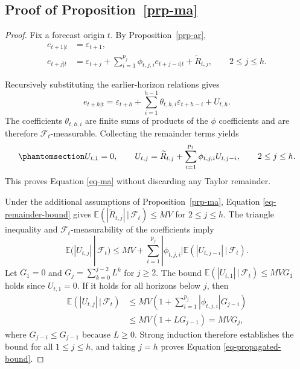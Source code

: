 \documentclass[
  american,
  12pt]{article}
\theoremstyle{plain}
\theoremstyle{plain}
\theoremstyle{remark}
\begin{document}
\subsection{\texorpdfstring{Proof of
Proposition~\ref{prp-ma}}{Proof of Proposition~}}\label{sec-proof_ma}

\begin{proof}
Fix a forecast origin \(t\). By Proposition~\ref{prp-ar}, \begin{align*}
e_{t+1|t}&=\varepsilon_{t+1},\\
e_{t+j|t}&=\varepsilon_{t+j}+\sum_{i=1}^{p_j}\phi_{t,j,i}e_{t+j-i|t}+\widetilde R_{t,j},\qquad 2\leq j\leq h.
\end{align*}

Recursively substituting the earlier-horizon relations gives \[
e_{t+h|t}=\varepsilon_{t+h}+\sum_{i=1}^{h-1}\theta_{t,h,i}\varepsilon_{t+h-i}+U_{t,h}.
\] The coefficients \(\theta_{t,h,i}\) are finite sums of products of
the \(\phi\) coefficients and are therefore \(\mathcal F_t\)-measurable.
Collecting the remainder terms yields
\begin{equation}\phantomsection\label{eq-propagated-remainder}{
U_{t,1}=0,\qquad
U_{t,j}=\widetilde R_{t,j}+\sum_{i=1}^{p_j}\phi_{t,j,i}U_{t,j-i},\qquad 2\leq j\leq h.
}\end{equation} This proves Equation \eqref{eq-ma} without discarding
any Taylor remainder.

Under the additional assumptions of Proposition~\ref{prp-ma}, Equation
\eqref{eq-remainder-bound} gives
\(\mathbb E(|\widetilde R_{t,j}|\,|\,\mathcal F_t)\leq MV\) for
\(2\leq j\leq h\). The triangle inequality and
\(\mathcal F_t\)-measurability of the coefficients imply \[
\mathbb E(|U_{t,j}|\,|\,\mathcal F_t)
\leq MV+\sum_{i=1}^{p_j}|\phi_{t,j,i}|
\mathbb E(|U_{t,j-i}|\,|\,\mathcal F_t).
\] Let \(G_1=0\) and \(G_j=\sum_{k=0}^{j-2}L^k\) for \(j\geq2\). The
bound \(\mathbb E(|U_{t,1}|\,|\,\mathcal F_t)\leq MVG_1\) holds since
\(U_{t,1}=0\). If it holds for all horizons below \(j\), then
\begin{align*}
\mathbb E(|U_{t,j}|\,|\,\mathcal F_t)
&\leq MV\left(1+\sum_{i=1}^{p_j}|\phi_{t,j,i}|G_{j-i}\right)\\
&\leq MV(1+LG_{j-1})=MVG_j,
\end{align*} where \(G_{j-i}\leq G_{j-1}\) because \(L\geq0\). Strong
induction therefore establishes the bound for all \(1\leq j\leq h\), and
taking \(j=h\) proves Equation \eqref{eq-propagated-bound}.
\end{proof}
\end{document}
